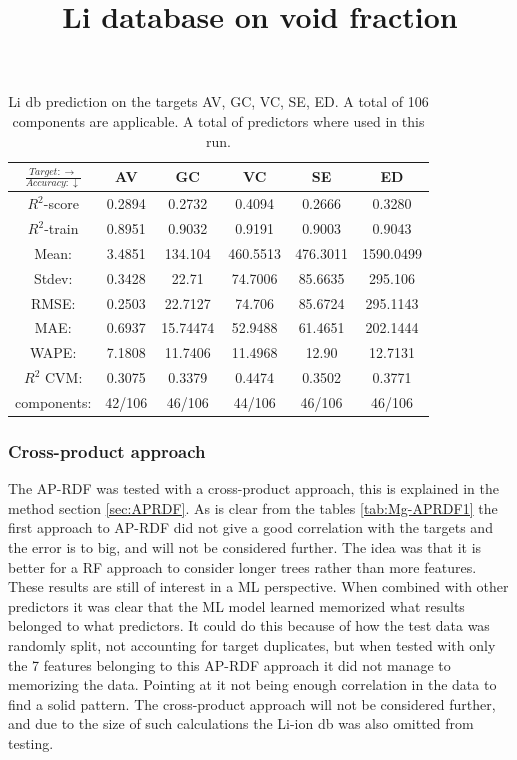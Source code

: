 \begin{table}[h]
\normalsize
\centering
\caption{Li db prediction on the targets AV, GC, VC, SE, ED. A total of 106 components are applicable. A total of  predictors where used in this run.}
\title{Li database on void fraction}
\begin{tabular}{|c|c|c|c|c|c|}
	\hline 
	$\frac{Target: \rightarrow}{Accuracy:\downarrow} $ & AV & GC & VC & SE & ED 
	 \\ 
	\hline
	$R^2$-score & 0.2894 & 0.2732 & 0.4094 &  0.2666 &  0.3280\\ 
	\hline 
	$R^2$-train & 0.8951 &  0.9032 & 0.9191 &  0.9003 & 0.9043 \\ 
	\hline
	Mean: &3.4851	&134.104	&460.5513&476.3011&1590.0499\\
	\hline 
	Stdev:&0.3428&22.71	&74.7006	&85.6635	&295.106	\\
	\hline 
	RMSE: &0.2503& 22.7127 &  74.706 & 85.6724 & 295.1143 \\ 
	\hline
	MAE: & 0.6937 & 15.74474& 52.9488 &  61.4651 & 202.1444 \\ 
	\hline
	WAPE: & 7.1808 & 11.7406 & 11.4968  & 12.90 & 12.7131 \\
	\hline
	$R^2$ CVM: & 0.3075 & 0.3379 & 0.4474  & 0.3502 & 0.3771 \\
	\hline
	components: & 42/106 & 46/106 & 44/106  & 46/106 & 46/106 \\
	\hline
\end{tabular}
\label{tab:Li-APRDF2}
\end{table}

\subsubsection{Cross-product approach}
The AP-RDF was tested with a cross-product approach, this is explained in the method section \ref{sec:APRDF}. As is clear from the tables \ref{tab:Mg-APRDF1} the first approach to AP-RDF did not give a good correlation with the targets and the error is to big, and will not be considered further. The idea was that it is better for a RF approach to consider longer trees rather than more features. These results are still of interest in a ML perspective. When combined with other predictors it was clear that the ML model learned memorized what results belonged to what predictors. It could do this because of how the test data was randomly split, not accounting for target duplicates, but when tested with only the 7 features belonging to this AP-RDF approach it did not manage to memorizing the data. Pointing at it not being enough correlation in the data to find a solid pattern. The cross-product approach will not be considered further, and due to the size of such calculations the Li-ion db was also omitted from testing.
 

